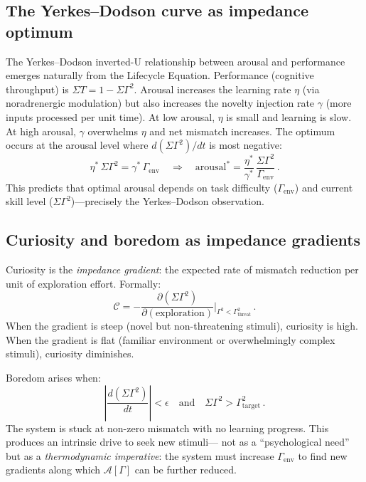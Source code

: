 ﻿\documentclass[aps,pre,twocolumn,superscriptaddress,floatfix]{revtex4-2}
\begin{document}
\subsection{The Yerkes--Dodson curve as impedance optimum}
\label{sec:yerkes-dodson}

The Yerkes--Dodson inverted-U relationship between
arousal and performance~\cite{YerkesDodson1908}
emerges naturally from the Lifecycle Equation.
Performance (cognitive throughput) is
$\Sigma T = 1 - \Sigma\Gamma^2$.
Arousal increases the learning rate $\eta$
(via noradrenergic modulation) but also increases
the novelty injection rate $\gamma$ (more inputs
processed per unit time).
At low arousal, $\eta$ is small and learning is slow.
At high arousal, $\gamma$ overwhelms $\eta$ and
net mismatch increases.
The optimum occurs at the arousal level where
$d(\Sigma\Gamma^2)/dt$ is most negative:
\begin{equation}
  \eta^*\,\Sigma\Gamma^2
    = \gamma^*\,\Gamma_{\mathrm{env}}
  \quad\Longrightarrow\quad
  \text{arousal}^* = \frac{\eta^*}{\gamma^*}\,
    \frac{\Sigma\Gamma^2}{\Gamma_{\mathrm{env}}}\,.
  \label{eq:yerkes-dodson}
\end{equation}
This predicts that optimal arousal depends on task
difficulty ($\Gamma_{\mathrm{env}}$) and current skill
level ($\Sigma\Gamma^2$)---precisely the
Yerkes--Dodson observation.


\subsection{Curiosity and boredom as impedance gradients}
\label{sec:curiosity-boredom}

Curiosity is the \emph{impedance gradient}:
the expected rate of mismatch reduction per unit
of exploration effort.
Formally:
\begin{equation}
  \mathcal{C} = -\frac{\partial(\Sigma\Gamma^2)}
    {\partial(\text{exploration})}
  \bigg|_{\Gamma^2 < \Gamma^2_{\mathrm{threat}}}\,.
  \label{eq:curiosity}
\end{equation}
When the gradient is steep (novel but non-threatening
stimuli), curiosity is high.
When the gradient is flat (familiar environment or
overwhelmingly complex stimuli), curiosity diminishes.

Boredom arises when:
\begin{equation}
  \left|\frac{d(\Sigma\Gamma^2)}{dt}\right| < \epsilon
  \quad\text{and}\quad
  \Sigma\Gamma^2 > \Gamma^2_{\mathrm{target}}\,.
  \label{eq:boredom}
\end{equation}
The system is stuck at non-zero mismatch with no
learning progress.
This produces an intrinsic drive to seek new stimuli---
not as a ``psychological need'' but as a
\emph{thermodynamic imperative}: the system must increase
$\Gamma_{\mathrm{env}}$ to find new gradients along
which $\mathcal{A}[\Gamma]$ can be further reduced.
\end{document}
